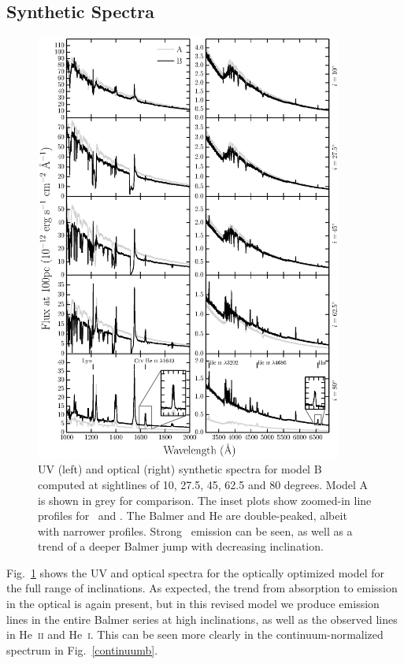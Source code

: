 \documentclass[preprint, a4paper, 11pt]{aastex}
\begin{document}



\subsection{Synthetic Spectra}

\begin{figure} %
\includegraphics[width=0.9\textwidth]{figures/modelb_uv_opt.eps}
\caption{
UV (left) and optical (right) synthetic spectra for model B computed at
sightlines of 10, 27.5, 45, 62.5 and 80 degrees. 
Model A is shown in grey for comparison.	
The inset plots show zoomed-in line profiles for 
\heiiuv\ and \ha. The Balmer and He
are double-peaked, albeit with narrower profiles.
Strong \heiiopt\ emission can be seen, as well as a trend
of a deeper Balmer jump with decreasing inclination.
}
\label{uvoptb}
\end{figure} %

Fig.~\ref{uvoptb} shows the UV and optical spectra for the
optically optimized model for the full range of inclinations. 
As expected, the trend from absorption to emission 
in the optical is again present, but in this revised model we produce emission
lines in the entire Balmer series at high inclinations, as well as the observed lines 
in He~\textsc{ii} and He~\textsc{i}. This can be seen more clearly in the 
continuum-normalized spectrum in Fig.~\ref{continuumb}.
\end{document}
